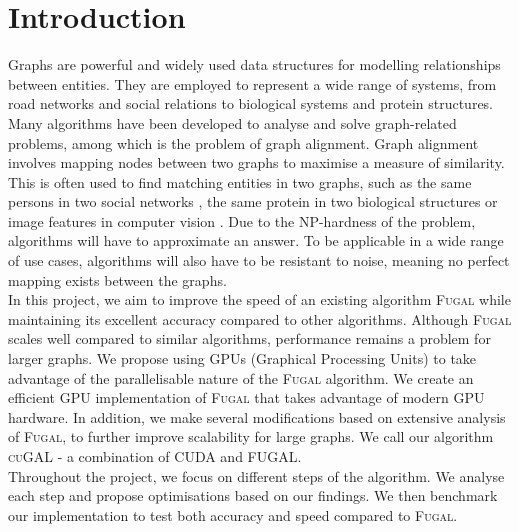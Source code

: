 \section{Introduction}
Graphs are powerful and widely used data structures for modelling relationships between entities. They are employed to represent a wide range of systems, from road networks and social relations to biological systems and protein structures. Many algorithms have been developed to analyse and solve graph-related problems, among which is the problem of graph alignment. Graph alignment involves mapping nodes between two graphs to maximise a measure of similarity. This is often used to find matching entities in two graphs, such as the same persons in two social networks \citep{koutra2013big}, the same protein in two biological structures \citep{singh2008isorank} or image features in computer vision \citep{conte2003graph}. Due to the NP-hardness of the problem, algorithms will have to approximate an answer. To be applicable in a wide range of use cases, algorithms will also have to be resistant to noise, meaning no perfect mapping exists between the graphs.\\

In this project, we aim to improve the speed of an existing algorithm \textsc{Fugal} \citep{fugal2024} while maintaining its excellent accuracy compared to other algorithms. Although \textsc{Fugal} scales well compared to similar algorithms, performance remains a problem for larger graphs. We propose using GPUs (Graphical Processing Units) to take advantage of the parallelisable nature of the \textsc{Fugal} algorithm. We create an efficient GPU implementation of \textsc{Fugal} that takes advantage of modern GPU hardware. In addition, we make several modifications based on extensive analysis of \textsc{Fugal}, to further improve scalability for large graphs. We call our algorithm \textsc{cuGAL} - a combination of CUDA and \textsc{FUGAL}.\\

Throughout the project, we focus on different steps of the algorithm. We analyse each step and propose optimisations based on our findings. We then benchmark our implementation to test both accuracy and speed compared to \textsc{Fugal}.